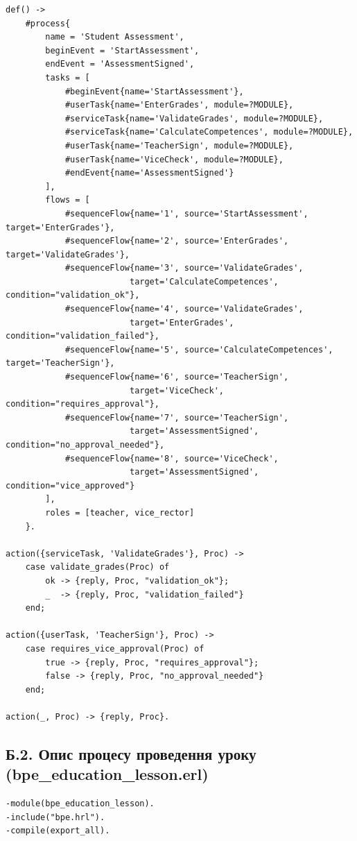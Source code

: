 \documentclass{article}
\begin{document}
\begin{appendix}
\begin{verbatim}
def() ->
    #process{
        name = 'Student Assessment',
        beginEvent = 'StartAssessment',
        endEvent = 'AssessmentSigned',
        tasks = [
            #beginEvent{name='StartAssessment'},
            #userTask{name='EnterGrades', module=?MODULE},
            #serviceTask{name='ValidateGrades', module=?MODULE},
            #serviceTask{name='CalculateCompetences', module=?MODULE},
            #userTask{name='TeacherSign', module=?MODULE},
            #userTask{name='ViceCheck', module=?MODULE},
            #endEvent{name='AssessmentSigned'}
        ],
        flows = [
            #sequenceFlow{name='1', source='StartAssessment', target='EnterGrades'},
            #sequenceFlow{name='2', source='EnterGrades', target='ValidateGrades'},
            #sequenceFlow{name='3', source='ValidateGrades', 
                         target='CalculateCompetences', condition="validation_ok"},
            #sequenceFlow{name='4', source='ValidateGrades', 
                         target='EnterGrades', condition="validation_failed"},
            #sequenceFlow{name='5', source='CalculateCompetences', target='TeacherSign'},
            #sequenceFlow{name='6', source='TeacherSign', 
                         target='ViceCheck', condition="requires_approval"},
            #sequenceFlow{name='7', source='TeacherSign', 
                         target='AssessmentSigned', condition="no_approval_needed"},
            #sequenceFlow{name='8', source='ViceCheck', 
                         target='AssessmentSigned', condition="vice_approved"}
        ],
        roles = [teacher, vice_rector]
    }.

action({serviceTask, 'ValidateGrades'}, Proc) ->
    case validate_grades(Proc) of
        ok -> {reply, Proc, "validation_ok"};
        _  -> {reply, Proc, "validation_failed"}
    end;

action({userTask, 'TeacherSign'}, Proc) ->
    case requires_vice_approval(Proc) of
        true -> {reply, Proc, "requires_approval"};
        false -> {reply, Proc, "no_approval_needed"}
    end;

action(_, Proc) -> {reply, Proc}.
\end{verbatim}

\subsection{Б.2. Опис процесу проведення уроку (bpe\_education\_lesson.erl)}
\begin{verbatim}
-module(bpe_education_lesson).
-include("bpe.hrl").
-compile(export_all).


\end{verbatim}
\end{appendix}
\end{document}
